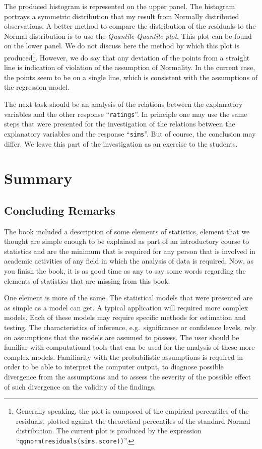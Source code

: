 \documentclass[]{krantz}
\theoremstyle{definition}
\theoremstyle{definition}
\theoremstyle{definition}
\theoremstyle{remark}
\begin{document}
The produced histogram is represented on the upper panel. The histogram portrays a symmetric
distribution that my result from Normally distributed observations. A
better method to compare the distribution of the residuals to the Normal
distribution is to use the \emph{Quantile-Quantile plot}. This plot can be
found on the lower panel. We do not
discuss here the method by which this plot is produced\footnote{Generally speaking, the plot is composed of the empirical
  percentiles of the residuals, plotted against the theoretical
  percentiles of the standard Normal distribution. The current plot is
  produced by the expression ``\texttt{qqnorm(residuals(sims.score))}''.}. However, we
do say that any deviation of the points from a straight line is
indication of violation of the assumption of Normality. In the current
case, the points seem to be on a single line, which is consistent with
the assumptions of the regression model.

The next task should be an analysis of the relations between the
explanatory variables and the other response ``\texttt{ratings}''. In principle
one may use the same steps that were presented for the investigation of
the relations between the explanatory variables and the response
``\texttt{sims}''. But of course, the conclusion may differ. We leave this part
of the investigation as an exercise to the students.

\hypertarget{summary-13}{%
\section{Summary}\label{summary-13}}

\hypertarget{concluding-remarks}{%
\subsection{Concluding Remarks}\label{concluding-remarks}}

The book included a description of some elements of statistics, element
that we thought are simple enough to be explained as part of an
introductory course to statistics and are the minimum that is required
for any person that is involved in academic activities of any field in
which the analysis of data is required. Now, as you finish the book, it
is as good time as any to say some words regarding the elements of
statistics that are missing from this book.

One element is more of the same. The statistical models that were
presented are as simple as a model can get. A typical application will
required more complex models. Each of these models may require specific
methods for estimation and testing. The characteristics of inference,
e.g.~significance or confidence levels, rely on assumptions that the
models are assumed to possess. The user should be familiar with
computational tools that can be used for the analysis of these more
complex models. Familiarity with the probabilistic assumptions is
required in order to be able to interpret the computer output, to
diagnose possible divergence from the assumptions and to assess the
severity of the possible effect of such divergence on the validity of
the findings.
\end{document}
